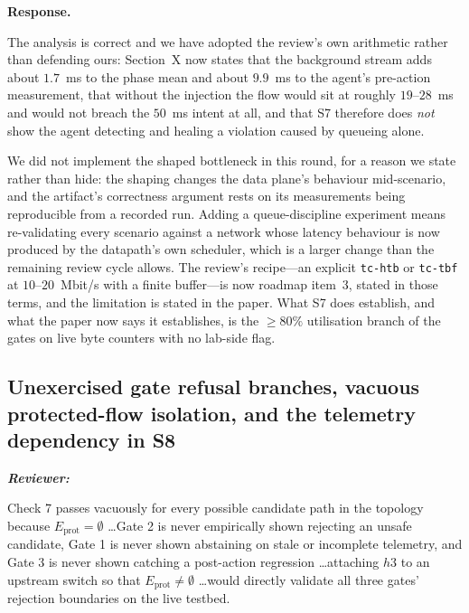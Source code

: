 \documentclass[11pt,a4paper]{article}
\newenvironment{reviewer}{\par\medskip\noindent\begin{minipage}{\linewidth}\small\itshape\color{quote}\textbf{Reviewer:}\par}{\end{minipage}\medskip\par}
\newenvironment{response}{\par\noindent\begin{minipage}{\linewidth}\small\textbf{Response.}\par}{\end{minipage}\medskip\par}
\begin{document}
\begin{response}
The analysis is correct and we have adopted the review's own arithmetic
rather than defending ours: Section~X now states that the background
stream adds about $1.7$~ms to the phase mean and about $9.9$~ms to the
agent's pre-action measurement, that without the injection the flow would
sit at roughly $19$--$28$~ms and would not breach the $50$~ms intent at
all, and that S7 therefore does \emph{not} show the agent detecting and
healing a violation caused by queueing alone.

We did not implement the shaped bottleneck in this round, for a reason we
state rather than hide: the shaping changes the data plane's behaviour
mid-scenario, and the artifact's correctness argument rests on its
measurements being reproducible from a recorded run. Adding a
queue-discipline experiment means re-validating every scenario against a
network whose latency behaviour is now produced by the datapath's own
scheduler, which is a larger change than the remaining review cycle
allows. The review's recipe---an explicit \texttt{tc-htb} or
\texttt{tc-tbf} at $10$--$20$~Mbit/s with a finite buffer---is now
roadmap item~3, stated in those terms, and the limitation is stated in
the paper. What S7 does establish, and what the paper now says it
establishes, is the $\ge 80\%$ utilisation branch of the gates on live
byte counters with no lab-side flag.
\end{response}

\subsection{Unexercised gate refusal branches, vacuous protected-flow
isolation, and the telemetry dependency in S8}

\begin{reviewer}
Check 7 passes vacuously for every possible candidate path in the topology
because $E_{\mathrm{prot}}=\emptyset$ \dots Gate 2 is never empirically
shown rejecting an unsafe candidate, Gate 1 is never shown abstaining on
stale or incomplete telemetry, and Gate 3 is never shown catching a
post-action regression \dots attaching $h3$ to an upstream switch so that
$E_{\mathrm{prot}}\neq\emptyset$ \dots would directly validate all three
gates' rejection boundaries on the live testbed.
\end{reviewer}
\end{document}
